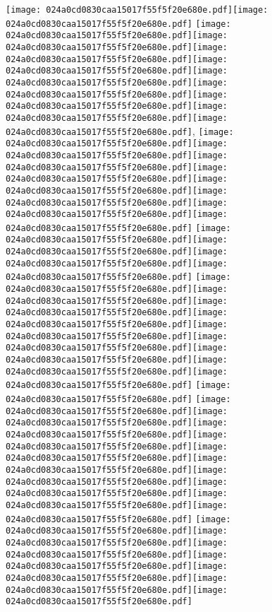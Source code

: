 \documentclass{article}
\newcommand{\origpg}[2]{\texttt{[image: 024a0cd0830caa15017f55f5f20e680e.pdf]}}
\begin{document}
{\vspace{-1.06pt}\origpg3{85.303pt 477.12pt 93.938pt 493.26pt}\origpg3{93.938pt 477.12pt 100.31pt 493.26pt} \origpg3{108.64pt 477.12pt 115.57pt 493.26pt}\hspace{-0.178pt}\origpg3{115.39pt 477.12pt 123.44pt 493.26pt}\origpg3{123.35pt 477.12pt 130.51pt 493.26pt}\hspace{-0.178pt}\origpg3{130.33pt 477.12pt 140.55pt 493.26pt}\origpg3{140.45pt 477.12pt 147.62pt 493.26pt}\hspace{-0.178pt}\origpg3{147.44pt 477.12pt 156.08pt 493.26pt}\origpg3{156.08pt 477.12pt 163.13pt 493.26pt}\hspace{-0.274pt}\origpg3{162.86pt 477.12pt 170.93pt 493.26pt}\hspace{-0.113pt}\origpg3{170.81pt 477.12pt 178.43pt 493.26pt}, \origpg3{191.01pt 477.12pt 201.22pt 493.26pt}\origpg3{201.13pt 477.12pt 208.29pt 493.26pt}\hspace{-0.178pt}\origpg3{208.11pt 477.12pt 216.75pt 493.26pt}\origpg3{216.75pt 477.12pt 224.17pt 493.26pt}\origpg3{224.24pt 477.12pt 236.3pt 493.26pt}\hspace{-0.258pt}\origpg3{236.04pt 477.12pt 248.46pt 493.26pt}\origpg3{248.55pt 477.12pt 257.18pt 493.26pt}\origpg3{257.18pt 477.12pt 265.25pt 493.26pt} \origpg3{273.34pt 477.12pt 280.5pt 493.26pt}\hspace{-0.178pt}\origpg3{280.33pt 477.12pt 287.94pt 493.26pt}\origpg3{288.02pt 477.12pt 296.1pt 493.26pt}\origpg3{296.19pt 477.12pt 303.36pt 493.26pt} \origpg3{311.59pt 477.12pt 318.76pt 493.26pt}\origpg3{318.8pt 477.12pt 326.87pt 493.26pt}\origpg3{326.97pt 477.12pt 334.14pt 493.26pt}\origpg3{334.19pt 477.12pt 341.24pt 493.26pt}\hspace{-0.307pt}\origpg3{340.93pt 477.12pt 349pt 493.26pt}\hspace{-0.355pt}\origpg3{348.65pt 477.12pt 356.07pt 493.26pt}\origpg3{356.07pt 477.12pt 364.71pt 493.26pt}\origpg3{364.77pt 477.12pt 373.41pt 493.26pt}\origpg3{373.41pt 477.12pt 380.57pt 493.26pt} \origpg3{388.6pt 477.12pt 396.21pt 493.26pt} \origpg3{404.46pt 477.12pt 412.68pt 493.26pt}\origpg3{412.68pt 477.12pt 421.31pt 493.26pt}\origpg3{421.31pt 477.12pt 428.48pt 493.26pt}\hspace{-0.161pt}\origpg3{428.32pt 477.12pt 436.16pt 493.26pt}\hspace{-0.129pt}\origpg3{436.03pt 477.12pt 444.1pt 493.26pt}\origpg3{444.2pt 477.12pt 451.36pt 493.26pt}\hspace{-0.178pt}\origpg3{451.19pt 477.12pt 458.24pt 493.26pt}\origpg3{458.18pt 477.12pt 466.81pt 493.26pt}\origpg3{466.81pt 477.12pt 477.66pt 493.26pt}\origpg3{477.66pt 477.12pt 484.82pt 493.26pt} \origpg3{493.09pt 477.12pt 503.3pt 493.26pt}\origpg3{503.21pt 477.12pt 511.28pt 493.26pt}\hspace{-0.355pt}\origpg3{510.92pt 477.12pt 521.14pt 493.26pt}\origpg3{521.04pt 477.12pt 528.21pt 493.26pt}\hspace{-0.178pt}\origpg3{528.03pt 477.12pt 536.67pt 493.26pt}\origpg3{536.67pt 477.12pt 543.72pt 493.26pt}\origpg3{543.72pt 477.12pt 554.57pt 493.26pt} 

}
\end{document}
